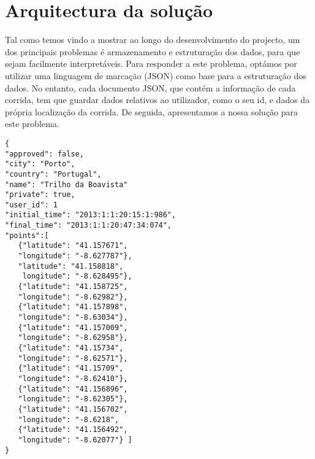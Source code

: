 \documentclass[twocolumn,twoside,10pt,a4paper]{article}
\begin{document}
\section{Arquitectura da solução}
Tal como temos vindo a mostrar ao longo do desenvolvimento do projecto, um dos principais problemas é armazenamento e estruturação dos dados, para que sejam facilmente interpretáveis. Para responder a este problema, optámos por utilizar uma linguagem de marcação (JSON) como base para a estruturação dos dados. No entanto, cada documento JSON, que contém a informação de cada corrida, tem que guardar dados relativos ao utilizador, como o seu id, e dados da própria localização da corrida. De seguida, apresentamos a nossa solução para este problema.

\begin{lstlisting}
{
"approved": false,
"city": "Porto",
"country": "Portugal",
"name": "Trilho da Boavista"
"private": true,
"user_id": 1
"initial_time": "2013:1:1:20:15:1:986",
"final_time": "2013:1:1:20:47:34:074",
"points":[
   {"latitude": "41.157671",
   "longitude": "-8.627787"},
   "latitude": "41.158818",
    longitude": "-8.628495"},
   {"latitude": "41.158725",
   "longitude": "-8.62982"},
   {"latitude": "41.157898",
   "longitude": "-8.63034"},
   {"latitude": "41.157009",
   "longitude": "-8.62958"},
   {"latitude": "41.15734",
   "longitude": "-8.62571"},
   {"latitude": "41.15709",
   "longitude": "-8.62410"},
   {"latitude": "41.156896",
   "longitude": "-8.62305"},
   {"latitude": "41.156702",
   "longitude": "-8.6218",
   {"latitude": "41.156492",
   "longitude": "-8.62077"} ]
}
\end{lstlisting}
\end{document}
